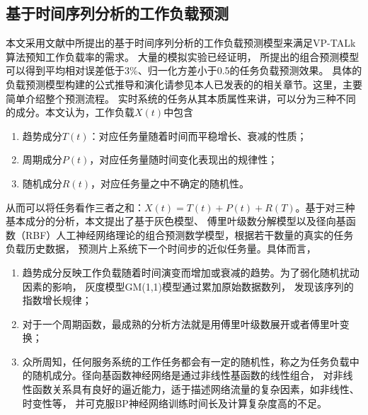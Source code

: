 \subsection{基于时间序列分析的工作负载预测}
\label{sec:prediction}
本文采用文献中所提出的基于时间序列分析的工作负载预测模型来满足VP-TALk算法预知工作负载率的需求。 大量的模拟实验已经证明， 所提出的组合预测模型可以得到平均相对误差低于3\%、归一化方差小于0.5的任务负载预测效果。 具体的负载预测模型构建的公式推导和演化请参见本人已发表的的相关章节。这里，主要简单介绍整个预测流程。
实时系统的任务从其本质属性来讲，可以分为三种不同的成分。本文认为，工作负载$X(t)$中包含
\begin{enumerate}[1)]
\item 趋势成分$T(t)$：对应任务量随着时间而平稳增长、衰减的性质；
\item 周期成分$P(t)$，对应任务量随时间变化表现出的规律性；
\item 随机成分$R(t)$，对应任务量之中不确定的随机性。
\end{enumerate}
从而可以将任务看作三者之和：$X(t)=T(t)+P(t)+R(T)$。基于对三种基本成分的分析，本文提出了基于灰色模型、 傅里叶级数分解模型以及径向基函数（RBF）人工神经网络理论的组合预测数学模型，根据若干数量的真实的任务负载历史数据， 预测片上系统下一个时间步的近似任务量。具体而言，
\begin{enumerate}[1)]
\item 趋势成分反映工作负载随着时间演变而增加或衰减的趋势。为了弱化随机扰动因素的影响， 灰度模型GM(1,1)模型通过累加原始数据数列， 发现该序列的指数增长规律；
\item 对于一个周期函数，最成熟的分析方法就是用傅里叶级数展开或者傅里叶变换；
\item 众所周知，任何服务系统的工作任务都会有一定的随机性，称之为任务负载中的随机成分。径向基函数神经网络是通过非线性基函数的线性组合， 对非线性函数关系具有良好的逼近能力，适于描述网络流量的复杂因素，如非线性、时变性等， 并可克服BP神经网络训练时间长及计算复杂度高的不足。
\end{enumerate}

